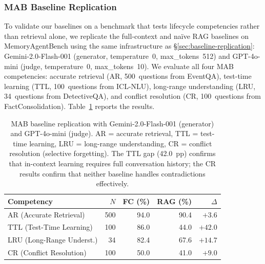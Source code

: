 \subsubsection{MAB Baseline Replication}
\label{sec:mab-replication}

To validate our baselines on a benchmark that tests lifecycle competencies
rather than retrieval alone, we replicate the full-context and na\"ive RAG
baselines on MemoryAgentBench using the same infrastructure as
\S\ref{sec:baseline-replication}: Gemini-2.0-Flash-001 (generator,
temperature~0, max\_tokens~512) and GPT-4o-mini (judge, temperature~0,
max\_tokens~10).  We evaluate all four MAB competencies: accurate retrieval
(AR, 500~questions from EventQA), test-time learning (TTL, 100~questions
from ICL-NLU), long-range understanding (LRU, 34~questions from
DetectiveQA), and conflict resolution (CR, 100~questions from
FactConsolidation).  Table~\ref{tab:mab-baselines} reports the results.

\begin{table}[!t]
\centering
\caption{MAB baseline replication with Gemini-2.0-Flash-001 (generator)
and GPT-4o-mini (judge).  AR = accurate retrieval, TTL = test-time
learning, LRU = long-range understanding, CR = conflict resolution
(selective forgetting).  The TTL gap (42.0~pp) confirms that in-context
learning requires full conversation history; the CR results confirm that
neither baseline handles contradictions effectively.}
\label{tab:mab-baselines}
\footnotesize
\begin{tabular}{@{}lrrrr@{}}
\toprule
\textbf{Competency} & \textbf{$N$} & \textbf{FC (\%)} & \textbf{RAG (\%)} & \textbf{$\Delta$} \\
\midrule
AR (Accurate Retrieval)     & 500 & 94.0 & 90.4 & $+3.6$ \\
TTL (Test-Time Learning)    & 100 & 86.0 & 44.0 & $+42.0$ \\
LRU (Long-Range Underst.)   &  34 & 82.4 & 67.6 & $+14.7$ \\
CR (Conflict Resolution)    & 100 & 50.0 & 41.0 & $+9.0$ \\
\bottomrule
\end{tabular}
\end{table}

